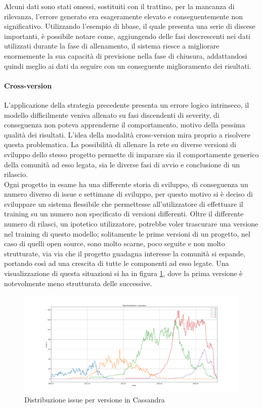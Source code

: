 \documentclass[%
    corpo=12pt,
    twoside,
    oldstyle,
    autoretitolo,
    greek,
    evenboxes,
]{toptesi}
\begin{document}
Alcuni dati sono stati omessi, sostituiti con il trattino, per la mancanza di rilevanza, l'errore generato era esageramente elevato e conseguentemente non significativo.
Utilizzando l'esempio di hbase, il quale presenta una serie di discese importanti, è possibile notare come, aggiungendo delle fasi descrescenti nei dati utilizzati durante la fase di allenamento, il sistema riesce a migliorare enormemente la sua capacità di previsione nella fase di chiusura, addattandosi quindi meglio ai dati da seguire con un conseguente miglioramento dei risultati.

\paragraph{Cross-version} L'applicazione della strategia precedente presenta un errore logico intrinseco, il modello difficilmente veniva allenato su fasi discendenti di severity, di conseguenza non poteva apprenderne il comportamento, motivo della pessima qualità dei risultati. L'idea della modalità cross-version mira proprio a risolvere questa problematica. La possibilità di allenare la rete su diverse versioni di sviluppo dello stesso progetto permette di imparare sia il comportamente generico della comunità ad esso legata, sia le diverse fasi di avvio e conclusione di un rilascio.\\
Ogni progetto in esame ha una differente storia di sviluppo, di conseguenza un numero diverso di issue e settimane di sviluppo, per questo motivo si è deciso di sviluppare un sistema flessibile che permettesse all'utilizzatore di effettuare il training su un numero non specificato di versioni differenti. Oltre il differente numero di rilasci, un ipotetico utilizzatore, potrebbe voler trascurare una versione nel training di questo modello; solitamente le prime versioni di un progetto, nel caso di quelli open source, sono molto scarne, poco seguite e non molto strutturate, via via che il progetto guadagna interesse la comunità si espande, portando così ad una crescita di tutte le componenti ad esso legate. Una visualizzazione di questa situazioni si ha in figura \ref{fig:cassandra_vers}, dove la prima versione è notevolmente meno strutturata delle successive.
\begin{figure}[!ht]
  \includegraphics[width=\linewidth]{figure/cassandra_vers.png}
  \caption{Distribuzione issue per versione in Cassandra}
  \label{fig:cassandra_vers}
\end{figure}
\end{document}
